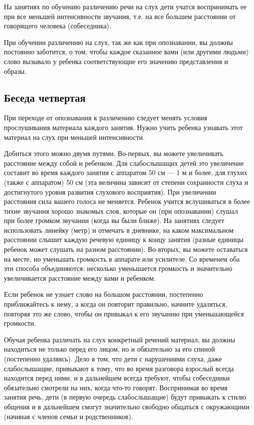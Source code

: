 \documentclass[a5paper]{book}
\begin{document}
На занятиях по обучению различению речи на слух дети учатся воспринимать
ее при все меньшей интенсивности звучания, т.е. на все большем
расстоянии от говорящего человека (собеседника).

При обучении различению на слух, так же как при опознавании, вы должны
постоянно заботится, о том, чтобы каждое сказанное вами (или другими
людьми) слово вызывало у ребенка соответствующие его значению
представления и образы.

\subsection*{Беседа четвертая}

При переходе от опознавания к различению следует менять условия
прослушивания материала каждого занятия. Нужно учить ребенка узнавать
этот материал на слух при меньшей интенсивности.

Добиться этого можно двумя путями. Во-первых, вы можете увеличивать
расстояние между собой и ребенком. Для слабослышащих детей это
увеличение составит во время каждого занятия с аппаратом 50 см --- 1 м и
более, для глухих (также с аппаратом) 50 см (эта величина зависит от
степени сохранности слуха и достигнутого уровня развития слухового
восприятия). При увеличении расстояния сила вашего голоса не меняется.
Ребенок учится вслушиваться в более тихие звучания хорошо знакомых слов,
которые он (при опознавании) слушал при более громком звучании (когда вы
были ближе). На занятиях следует использовать линейку (метр) и отмечать
в дневнике, на каком максимальном расстоянии слышит каждую речевую
единицу к концу занятия (разные единицы ребенок может слушать на разном
расстоянии). Во-вторых, вы можете оставаться на месте, но уменьшать
громкость в аппарате или усилителе. Со временем оба эти способа
объединяются: несколько уменьшается громкость и значительно
увеличивается расстояние между вами и ребенком.

Если ребенок не узнает слово на большом расстоянии, постепенно
приближайтесь к нему, а когда он повторит правильно, начните удаляться,
повторяя это же слово, чтобы он привыкал к его звучанию при
уменьшающейся громкости.

Обучая ребенка различать на слух конкретный речений материал, вы должны
находиться не только перед его лицом, но и обязательно за его спиной
(постепенно удаляясь). Дело в том, что дети с нарушениями слуха, даже
слабослышащие, привыкают к тому, что во время разговора взрослый всегда
находится перед ними, и в дальнейшем всегда требуют, чтобы собеседники
обязательно смотрели на них, когда что-то говорят. Воспринимая во время
занятия речь, дети (в первую очередь слабослышащие) будут привыкать к
стилю общения и в дальнейшем смогут значительно свободно общаться с
окружающими (начиная с членов семьи и родственников).
\end{document}
